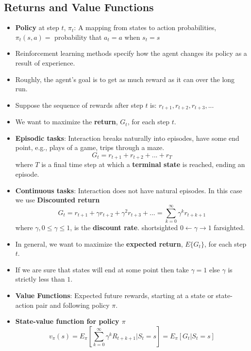 \documentclass[a4paper]{article}
\begin{document}
\subsection{Returns and Value Functions}
\begin{itemize}
    \item \textbf{Policy} at step $t$, $\pi_t$: A mapping from states to action probabilities,\\
    $\pi_t(s,a)=$ probability that $a_t=a$ when $s_t=s$
    \item Reinforcement learning methods specify how the agent changes its policy as a result of experience.
    \item Roughly, the agent's goal is to get as much reward as it can over the long run.
    \item Suppose the sequence of rewards after step $t$ is: $r_{t+1},r_{t+2},r_{t+3},...$
    \item We want to maximize the \textbf{return}, $G_t$, for each step $t$.
    \item \textbf{Episodic tasks}: Interaction breaks naturally into episodes, have some end point, e.g., plays of a game, trips through a maze.
    \begin{equation*}
        G_t=r_{t+1}+r_{t+2}+...+r_T
    \end{equation*}
    where $T$ is a final time step at which a \textbf{terminal state} is reached, ending an episode.
    \item \textbf{Continuous tasks}: Interaction does not have natural episodes. In this case we use \textbf{Discounted return}
    \begin{equation*}
        G_t=r_{t+1}+\gamma r_{t+2}+\gamma^2r_{t+3}+...=\sum_{k=0}^\infty \gamma^kr_{t+k+1}
    \end{equation*}
    where $\gamma,0\leq \gamma \leq 1$, is the \textbf{discount rate}. shortsighted $0\gets \gamma \to 1$ farsighted.
    \item In general, we want to maximize the \textbf{expected return}, $E\{G_t\}$, for each step $t$.
    \item If we are sure that states will end at some point then take $\gamma=1$ else $\gamma$ is strictly less than $1$.
    \item \textbf{Value Functions}: Expected future rewards, starting at a state or state-action pair and following policy $\pi$.
    \item \textbf{State-value function for policy $\pi$}
    \begin{equation*}
        v_\pi(s)=E_\pi[\sum_{k=0}^\infty \gamma^kR_{t+k+1}|S_t=s]=E_\pi[G_t|S_t=s]

\end{equation*}
\end{itemize}
\end{document}

